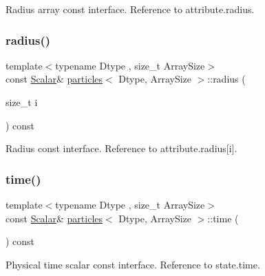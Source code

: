 Radius array const interface. Reference to attribute.\+radius. 

\mbox{\label{classparticles_a0cfef4b7cd6b082df8be56dff927a0d5}} 
\subsubsection{\texorpdfstring{radius()}{radius()}\hspace{0.1cm}{\footnotesize\ttfamily [2/2]}}
{\footnotesize\ttfamily template$<$typename Dtype , size\+\_\+t Array\+Size$>$ \\
const \mbox{\hyperlink{classparticles_a57a6b6582045a4b20742b99c513e9f63}{Scalar}}\& \mbox{\hyperlink{classparticles}{particles}}$<$ Dtype, Array\+Size $>$\+::radius (\begin{DoxyParamCaption}\item[{size\+\_\+t}]{i }\end{DoxyParamCaption}) const\hspace{0.3cm}{\ttfamily [inline]}}



Radius const interface. Reference to attribute.\+radius\mbox{[}i\mbox{]}. 

\mbox{\label{classparticles_a4b70f028165f9cb6bd510c824bd16cc1}} 
\subsubsection{\texorpdfstring{time()}{time()}}
{\footnotesize\ttfamily template$<$typename Dtype , size\+\_\+t Array\+Size$>$ \\
const \mbox{\hyperlink{classparticles_a57a6b6582045a4b20742b99c513e9f63}{Scalar}}\& \mbox{\hyperlink{classparticles}{particles}}$<$ Dtype, Array\+Size $>$\+::time (\begin{DoxyParamCaption}{ }\end{DoxyParamCaption}) const\hspace{0.3cm}{\ttfamily [inline]}}



Physical time scalar const interface. Reference to state.\+time. 

\mbox{\label{classparticles_ab6116d23f77eb1e10c0b755f3f273c8b}} 
